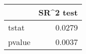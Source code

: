 \begin{tabular}{lr}
\toprule
{} &  SR\textasciicircum 2 test \\
\midrule
tstat  &     0.0279 \\
pvalue &     0.0037 \\
\bottomrule
\end{tabular}
